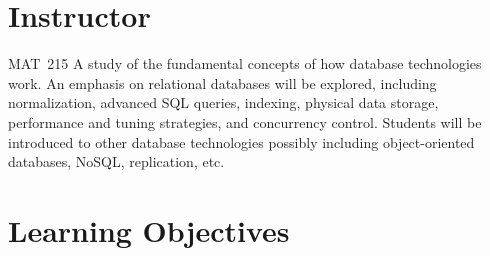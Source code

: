 \documentclass[11pt]{article}
\begin{document}


\section{Instructor}



\begin{catalogentry}{MAT~215}
  A study of the fundamental concepts of how database technologies work.
  An emphasis on relational databases will be explored,
  including normalization, advanced SQL queries, indexing, physical data storage,
  performance and tuning strategies, and concurrency control.
  Students will be introduced to other database technologies
  possibly including object-oriented databases, NoSQL, replication, etc.
\end{catalogentry}

\section{Learning Objectives}
\end{document}
